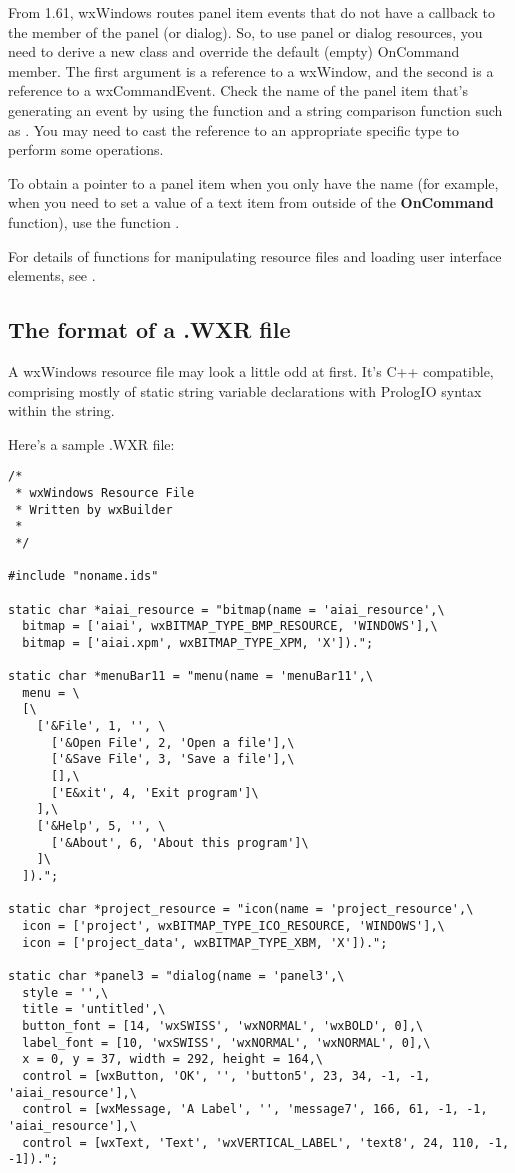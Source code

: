 From 1.61, wxWindows routes panel item events that do not have a callback
to the  member of the panel (or dialog). So, to use
panel or dialog resources, you need to derive a new class and override the
default (empty) OnCommand member. The first argument is a reference
to a wxWindow, and the second is a reference to a wxCommandEvent. Check the
name of the panel item that's generating an event by using the \rtfsp
function and a string comparison function such as .
You may need to cast the reference to an appropriate specific type to perform
some operations.

To obtain a pointer to a panel item when you only have the name (for example,
when you need to set a value of a text item from outside of the {\bf OnCommand} function),
use the function .

For details of functions for manipulating resource files and loading
user interface elements, see .

\subsection{The format of a .WXR file}

A wxWindows resource file may look a little odd at first. It's C++
compatible, comprising mostly of static string variable declarations with
PrologIO syntax within the string.

Here's a sample .WXR file:

\begin{verbatim}
/*
 * wxWindows Resource File
 * Written by wxBuilder
 *
 */

#include "noname.ids"

static char *aiai_resource = "bitmap(name = 'aiai_resource',\
  bitmap = ['aiai', wxBITMAP_TYPE_BMP_RESOURCE, 'WINDOWS'],\
  bitmap = ['aiai.xpm', wxBITMAP_TYPE_XPM, 'X']).";

static char *menuBar11 = "menu(name = 'menuBar11',\
  menu = \
  [\
    ['&File', 1, '', \
      ['&Open File', 2, 'Open a file'],\
      ['&Save File', 3, 'Save a file'],\
      [],\
      ['E&xit', 4, 'Exit program']\
    ],\
    ['&Help', 5, '', \
      ['&About', 6, 'About this program']\
    ]\
  ]).";

static char *project_resource = "icon(name = 'project_resource',\
  icon = ['project', wxBITMAP_TYPE_ICO_RESOURCE, 'WINDOWS'],\
  icon = ['project_data', wxBITMAP_TYPE_XBM, 'X']).";

static char *panel3 = "dialog(name = 'panel3',\
  style = '',\
  title = 'untitled',\
  button_font = [14, 'wxSWISS', 'wxNORMAL', 'wxBOLD', 0],\
  label_font = [10, 'wxSWISS', 'wxNORMAL', 'wxNORMAL', 0],\
  x = 0, y = 37, width = 292, height = 164,\
  control = [wxButton, 'OK', '', 'button5', 23, 34, -1, -1, 'aiai_resource'],\
  control = [wxMessage, 'A Label', '', 'message7', 166, 61, -1, -1, 'aiai_resource'],\
  control = [wxText, 'Text', 'wxVERTICAL_LABEL', 'text8', 24, 110, -1, -1]).";
\end{verbatim}

